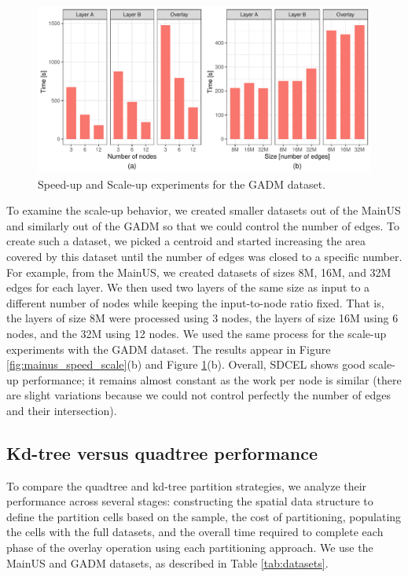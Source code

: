 \begin{figure}
    \centering
    \includegraphics[width=\textwidth]{chapterSDCEL/GADM_SS/GADM_SS}
    \caption{Speed-up and Scale-up experiments for the GADM dataset.} \label{fig:gadm_speed_scale}
\end{figure}

To examine the scale-up behavior, we created smaller datasets out of the MainUS and similarly out of the GADM so that we could control the number of edges. To create such a dataset, we picked a centroid and started increasing the area covered by this dataset until the number of edges was closed to a specific number. For example, from the MainUS, we created datasets of sizes 8M, 16M, and 32M edges for each layer. We then used two layers of the same size as input to a different number of nodes while keeping the input-to-node ratio fixed. That is, the layers of size 8M were processed using 3 nodes, the layers of size 16M using 6 nodes, and the 32M using 12 nodes. We used the same process for the scale-up experiments with the GADM dataset. The results appear in Figure \ref{fig:mainus_speed_scale}(b) and Figure \ref{fig:gadm_speed_scale}(b).  Overall, SDCEL shows good scale-up performance; it remains almost constant as the work per node is similar (there are slight variations because we could not control perfectly the number of edges and their intersection).

\subsection{Kd-tree versus quadtree performance} \label{sec:comparison}
To compare the quadtree and kd-tree partition strategies, we analyze their performance across several stages: constructing the spatial data structure to define the partition cells based on the sample, the cost of partitioning, populating the cells with the full datasets, and the overall time required to complete each phase of the overlay operation using each partitioning approach. We use the MainUS and GADM datasets, as described in Table \ref{tab:datasets}.

